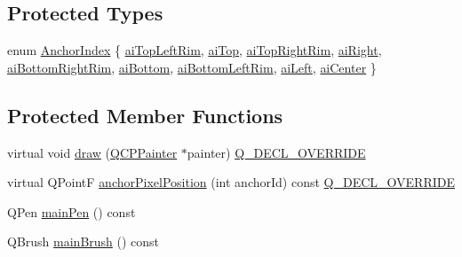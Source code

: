\subsection*{Protected Types}
\begin{DoxyCompactItemize}
\item 
enum \hyperlink{class_q_c_p_item_ellipse_a415009889543169f35b70795f415e45e}{Anchor\+Index} \{ \newline
\hyperlink{class_q_c_p_item_ellipse_a415009889543169f35b70795f415e45eab2538849b88921e7fc1dcc15b2a6109d}{ai\+Top\+Left\+Rim}, 
\hyperlink{class_q_c_p_item_ellipse_a415009889543169f35b70795f415e45ea83e55b0c1799baac1eecab52bcbe096d}{ai\+Top}, 
\hyperlink{class_q_c_p_item_ellipse_a415009889543169f35b70795f415e45ea415d82233c14f0c70c245d50e706e75b}{ai\+Top\+Right\+Rim}, 
\hyperlink{class_q_c_p_item_ellipse_a415009889543169f35b70795f415e45ea0f0dcfdf87d9405b53b2129740fb6ba6}{ai\+Right}, 
\newline
\hyperlink{class_q_c_p_item_ellipse_a415009889543169f35b70795f415e45eab62732e96d67801d50c6a9bdebc374d0}{ai\+Bottom\+Right\+Rim}, 
\hyperlink{class_q_c_p_item_ellipse_a415009889543169f35b70795f415e45ea5894287dedaeec1f48394fd950ccff5b}{ai\+Bottom}, 
\hyperlink{class_q_c_p_item_ellipse_a415009889543169f35b70795f415e45ea7b8101bfc590af8ce32961f6545c4f90}{ai\+Bottom\+Left\+Rim}, 
\hyperlink{class_q_c_p_item_ellipse_a415009889543169f35b70795f415e45eae74dad00419a0e1f42877510158fb922}{ai\+Left}, 
\newline
\hyperlink{class_q_c_p_item_ellipse_a415009889543169f35b70795f415e45ea580ec0e9b9fd1488fccf5783e52c0c02}{ai\+Center}
 \}
\end{DoxyCompactItemize}
\subsection*{Protected Member Functions}
\begin{DoxyCompactItemize}
\item 
virtual void \hyperlink{class_q_c_p_item_ellipse_a77eebd67a402fc496082a2e51356928c}{draw} (\hyperlink{class_q_c_p_painter}{Q\+C\+P\+Painter} $\ast$painter) \hyperlink{qcustomplot_8h_a42cc5eaeb25b85f8b52d2a4b94c56f55}{Q\+\_\+\+D\+E\+C\+L\+\_\+\+O\+V\+E\+R\+R\+I\+DE}
\item 
virtual Q\+PointF \hyperlink{class_q_c_p_item_ellipse_a35cd6983c61a16ac33c23f08dd2817cc}{anchor\+Pixel\+Position} (int anchor\+Id) const \hyperlink{qcustomplot_8h_a42cc5eaeb25b85f8b52d2a4b94c56f55}{Q\+\_\+\+D\+E\+C\+L\+\_\+\+O\+V\+E\+R\+R\+I\+DE}
\item 
Q\+Pen \hyperlink{class_q_c_p_item_ellipse_a9c11717026dfd685c83a9650666b7181}{main\+Pen} () const
\item 
Q\+Brush \hyperlink{class_q_c_p_item_ellipse_a6218bdf5e703f609b934b0bf9c8d0971}{main\+Brush} () const
\end{DoxyCompactItemize}

